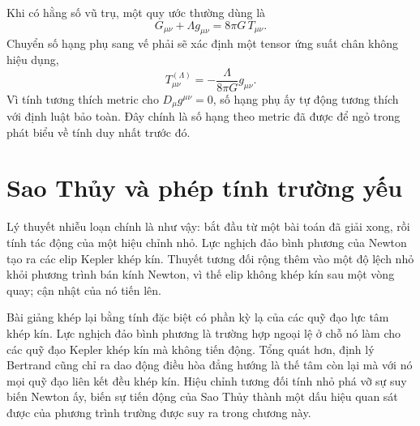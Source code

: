 Khi có hằng số vũ trụ, một quy ước thường dùng là
\begin{equation}
 G_{\mu\nu}+\Lambda g_{\mu\nu}
 =
 8\pi G\,T_{\mu\nu}.
\end{equation}
Chuyển số hạng phụ sang vế phải sẽ xác định một tensor ứng suất chân không hiệu dụng,
\begin{equation}
 T_{\mu\nu}^{(\Lambda)}
 =
 -\frac{\Lambda}{8\pi G}g_{\mu\nu}.
\end{equation}
Vì tính tương thích metric cho \(D_\mu g^{\mu\nu}=0\), số hạng phụ ấy tự động tương thích với định luật bảo toàn. Đây chính là số hạng theo metric đã được để ngỏ trong phát biểu về tính duy nhất trước đó.

\section{Sao Thủy và phép tính trường yếu}

\begin{classroomqa}
\end{classroomqa}

Lý thuyết nhiễu loạn chính là như vậy: bắt đầu từ một bài toán đã giải xong, rồi tính tác động của một hiệu chỉnh nhỏ. Lực nghịch đảo bình phương của Newton tạo ra các elip Kepler khép kín. Thuyết tương đối rộng thêm vào một độ lệch nhỏ khỏi phương trình bán kính Newton, vì thế elip không khép kín sau một vòng quay; cận nhật của nó tiến lên.

Bài giảng khép lại bằng tính đặc biệt có phần kỳ lạ của các quỹ đạo lực tâm khép kín. Lực nghịch đảo bình phương là trường hợp ngoại lệ ở chỗ nó làm cho các quỹ đạo Kepler khép kín mà không tiến động. Tổng quát hơn, định lý Bertrand cũng chỉ ra dao động điều hòa đẳng hướng là thế tâm còn lại mà với nó mọi quỹ đạo liên kết đều khép kín. Hiệu chỉnh tương đối tính nhỏ phá vỡ sự suy biến Newton ấy, biến sự tiến động của Sao Thủy thành một dấu hiệu quan sát được của phương trình trường được suy ra trong chương này.